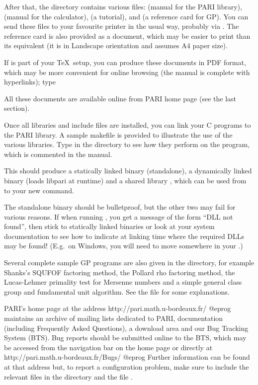 After that, the  directory contains various  files:
 (manual for the PARI library),  (manual
for the  calculator),  (a tutorial), and
 (a reference card for GP). You can send these files to your
favourite printer in the usual way, probably via . The reference
card is also provided as a  document, which may be easier to
print than its  equivalent (it is in Landscape orientation and
assumes A4 paper size).

\noindent If  is part of your \TeX\ setup, you can produce these
documents in PDF format, which may be more convenient for online browsing
(the manual is complete with hyperlinks); type


\noindent All these documents are available online from PARI home page
(see the last section).

 Once all libraries and include files are installed,
you can link your C programs to the PARI library. A sample makefile
 is provided to illustrate the use of the various
libraries. Type  in the  directory to see how
they perform on the  program, which is commented in the
manual.

This should produce a statically linked binary 
(standalone), a dynamically linked binary  (loads libpari
at runtime) and a shared library , which can be used from
 to  your new  command.

The standalone binary should be bulletproof, but the other two may fail
for various reasons. If when running , you get a message
of the form ``DLL not found'', then stick to statically linked binaries
or look at your system documentation to see how to indicate at linking
time where the required DLLs may be found! (E.g.~on Windows, you will
need to move  somewhere in your .)

 Several complete sample GP programs are also given in
the  directory, for example Shanks's SQUFOF factoring method,
the Pollard rho factoring method, the Lucas-Lehmer primality test for
Mersenne numbers and a simple general class group and fundamental unit
algorithm. See the file  for some explanations.

 PARI's home page at the address
\bprog
  http://pari.math.u-bordeaux.fr/
@eprog\noindent
maintains an archive of mailing lists dedicated to PARI, documentation
(including Frequently Asked Questions), a download area and our Bug Tracking
System (BTS). Bug reports should be submitted online to the BTS, which may be
accessed from the navigation bar on the home page or directly at
\bprog
  http://pari.math.u-bordeaux.fr/Bugs/
@eprog\noindent
Further information can be found at that address but, to report a
configuration problem, make sure to include the relevant  files in
the  directory and the file .
\smallskip

